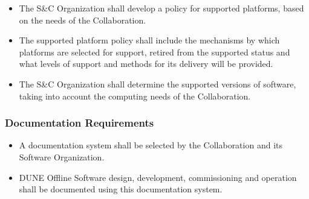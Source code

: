 \begin{itemize}

\item The S\&C Organization shall develop a policy for supported platforms, based on the needs of the Collaboration.  

\item The supported platform policy shall include the mechanisms by which platforms are selected for support, retired from
 the supported status and what levels of support and methods for its delivery will be provided.
 
\item The S\&C Organization shall determine the supported versions of software, taking into account the computing needs of the Collaboration.
\end{itemize}

\subsubsection{Documentation Requirements}
\begin{itemize}

\item A documentation system shall be selected by the Collaboration and its Software Organization.

\item DUNE Offline Software design, development, commissioning and operation shall be documented using this documentation system.

\end{itemize}


